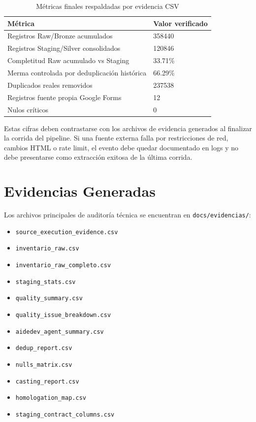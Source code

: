 \documentclass[12pt,a4paper]{article}
\newcommand{\pathcode}[1]{\begingroup\footnotesize\ttfamily\nolinkurl{#1}\endgroup}
\begin{document}
\begin{table}[H]
\centering
\footnotesize
{}
\begin{tabular}{|P{7.5cm}|P{3.8cm}|}
\hline
{}
\textbf{M\'etrica} & \textbf{Valor verificado} \\ \hline
Registros Raw/Bronze acumulados & 358440 \\ \hline
Registros Staging/Silver consolidados & 120846 \\ \hline
Completitud Raw acumulado vs Staging & 33.71\% \\ \hline
Merma controlada por deduplicaci\'on hist\'orica & 66.29\% \\ \hline
Duplicados reales removidos & 237538 \\ \hline
Registros fuente propia Google Forms & 12 \\ \hline
Nulos cr\'iticos & 0 \\ \hline
\end{tabular}
\caption{M\'etricas finales respaldadas por evidencia CSV}
\end{table}

Estas cifras deben contrastarse con los archivos de evidencia generados al finalizar la corrida del pipeline. Si una fuente externa falla por restricciones de red, cambios HTML o rate limit, el evento debe quedar documentado en logs y no debe presentarse como extracci\'on exitosa de la \'ultima corrida.

\section{Evidencias Generadas}

Los archivos principales de auditor\'ia t\'ecnica se encuentran en \pathcode{docs/evidencias/}:

\begin{itemize}[leftmargin=1.2cm]
    \item \pathcode{source_execution_evidence.csv}
    \item \pathcode{inventario_raw.csv}
    \item \pathcode{inventario_raw_completo.csv}
    \item \pathcode{staging_stats.csv}
    \item \pathcode{quality_summary.csv}
    \item \pathcode{quality_issue_breakdown.csv}
    \item \pathcode{aidedev_agent_summary.csv}
    \item \pathcode{dedup_report.csv}
    \item \pathcode{nulls_matrix.csv}
    \item \pathcode{casting_report.csv}
    \item \pathcode{homologation_map.csv}
    \item \pathcode{staging_contract_columns.csv}
\end{itemize}
\end{document}
